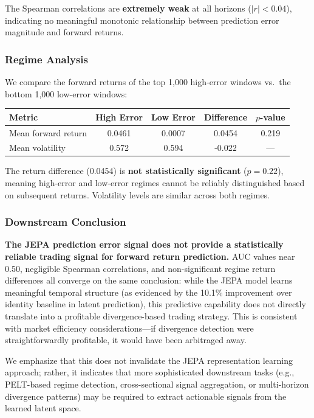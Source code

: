 \documentclass[11pt]{article}
\begin{document}
The Spearman correlations are \textbf{extremely weak} at all horizons ($|r| < 0.04$), indicating no meaningful monotonic relationship between prediction error magnitude and forward returns.

\subsubsection{Regime Analysis}

We compare the forward returns of the top 1,000 high-error windows vs.\ the bottom 1,000 low-error windows:

\begin{center}
\begin{tabular}{lcccc}
\toprule
Metric & High Error & Low Error & Difference & $p$-value \\
\midrule
Mean forward return & 0.0461 & 0.0007 & 0.0454 & 0.219 \\
Mean volatility     & 0.572  & 0.594  & -0.022 & --- \\
\bottomrule
\end{tabular}
\end{center}

The return difference (0.0454) is \textbf{not statistically significant} ($p=0.22$), meaning high-error and low-error regimes cannot be reliably distinguished based on subsequent returns. Volatility levels are similar across both regimes.

\subsubsection{Downstream Conclusion}

\textbf{The JEPA prediction error signal does not provide a statistically reliable trading signal for forward return prediction.} AUC values near 0.50, negligible Spearman correlations, and non-significant regime return differences all converge on the same conclusion: while the JEPA model learns meaningful temporal structure (as evidenced by the 10.1\% improvement over identity baseline in latent prediction), this predictive capability does not directly translate into a profitable divergence-based trading strategy. This is consistent with market efficiency considerations---if divergence detection were straightforwardly profitable, it would have been arbitraged away.

We emphasize that this does not invalidate the JEPA representation learning approach; rather, it indicates that more sophisticated downstream tasks (e.g., PELT-based regime detection, cross-sectional signal aggregation, or multi-horizon divergence patterns) may be required to extract actionable signals from the learned latent space.
\end{document}
